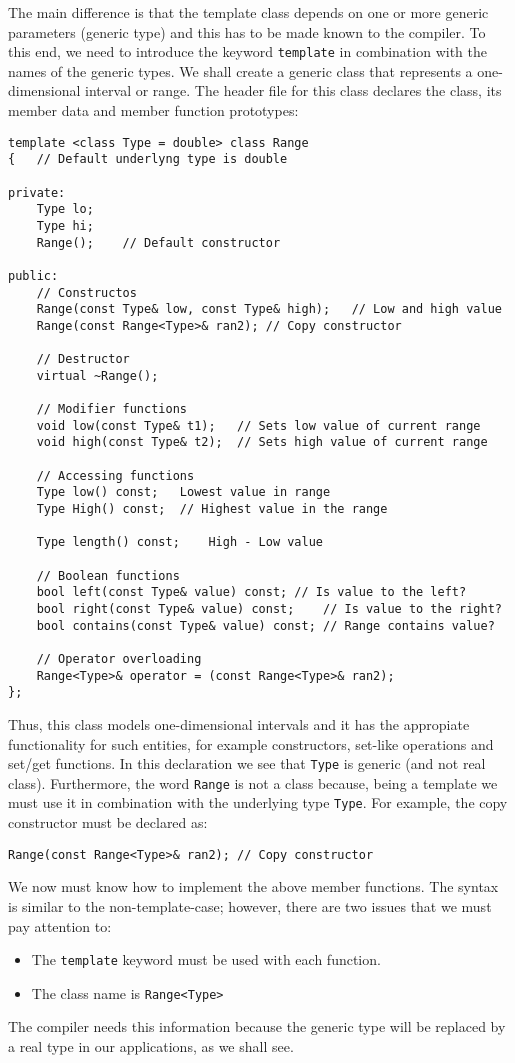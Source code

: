 The main difference is that the template class depends on one or more generic parameters (generic type) and this has to be made known to the compiler. To this end, we need to introduce the keyword \texttt{template} in combination with the names of the generic types. We shall create a generic class that represents a one-dimensional interval or range. The header file for this class declares the class, its member data and member function prototypes:
\begin{lstlisting}
template <class Type = double> class Range
{	// Default underlyng type is double

private:
	Type lo;
	Type hi;
	Range();	// Default constructor

public:
	// Constructos
	Range(const Type& low, const Type& high);	// Low and high value
	Range(const Range<Type>& ran2);	// Copy constructor

	// Destructor
	virtual ~Range();

	// Modifier functions
	void low(const Type& t1);	// Sets low value of current range
	void high(const Type& t2);	// Sets high value of current range

	// Accessing functions
	Type low() const;	Lowest value in range
	Type High() const;	// Highest value in the range

	Type length() const;	High - Low value

	// Boolean functions
	bool left(const Type& value) const;	// Is value to the left?
	bool right(const Type& value) const;	// Is value to the right?
	bool contains(const Type& value) const;	// Range contains value?

	// Operator overloading
	Range<Type>& operator = (const Range<Type>& ran2);
};
\end{lstlisting}
Thus, this class models one-dimensional intervals and it has the appropiate functionality for such entities, for example constructors, set-like operations and set/get functions. In this declaration we see that \texttt{Type} is generic (and not real class). Furthermore, the word \texttt{Range} is not a class because, being a template we must use it in combination with the underlying type \texttt{Type}. For example, the copy constructor must be declared as:
\begin{lstlisting}
Range(const Range<Type>& ran2);	// Copy constructor
\end{lstlisting}
We now must know how to implement the above member functions. The syntax is similar to the non-template-case; however, there are two issues that we must pay attention to:
\begin{itemize}
	\item The \texttt{template} keyword must be used with each function.
	\item The class name is \texttt{Range<Type>}
\end{itemize}
The compiler needs this information because the generic type will be replaced by a real type in our applications, as we shall see.

